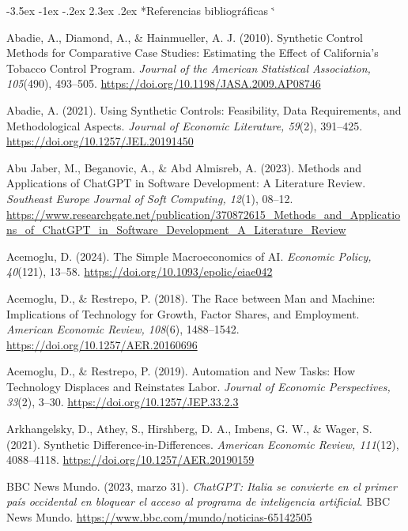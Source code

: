 \documentclass[12pt,a4paper]{article}
\makeatletter
\renewcommand{\refname}{\centering\normalfont Referencias bibliográficas}%
\renewcommand\section{\@startsection{section}{1}{\z@}%
  {-3.5ex \@plus -1ex \@minus -.2ex}%
  {2.3ex \@plus.2ex}%
  {\normalfont\normalsize}}
\renewenvironment{thebibliography}[1]{%
  \section*{\refname}%
  \list{}{%
    \usecounter{enumiv}%
    \setlength{\labelwidth}{0pt}%
    \setlength{\labelsep}{0pt}%
    \setlength{\leftmargin}{1.27cm}%
    \setlength{\itemindent}{-1.27cm}%
    \setlength{\itemsep}{\baselineskip}%
    \setlength{\parsep}{0pt}%
  }%
  \sloppy
  \clubpenalty4000\widowpenalty4000%
  \sfcode`\.\@m}%
  {\def\@noitemerr{\@latex@warning{Empty `thebibliography' environment}}%
   \endlist}
\makeatother
\begin{document}
{}
\begin{singlespacing}
\begin{thebibliography}{}
\setlength{\itemsep}{\baselineskip}  %

Abadie, A., Diamond, A., \& Hainmueller, A. J. (2010). Synthetic Control Methods for Comparative Case Studies: Estimating the Effect of California's Tobacco Control Program. \textit{Journal of the American Statistical Association, 105}(490), 493–505. \url{https://doi.org/10.1198/JASA.2009.AP08746}

Abadie, A. (2021). Using Synthetic Controls: Feasibility, Data Requirements, and Methodological Aspects. \textit{Journal of Economic Literature, 59}(2), 391–425. \url{https://doi.org/10.1257/JEL.20191450}

Abu Jaber, M., Beganovic, A., \& Abd Almisreb, A. (2023). Methods and Applications of ChatGPT in Software Development: A Literature Review. \textit{Southeast Europe Journal of Soft Computing, 12}(1), 08–12. \url{https://www.researchgate.net/publication/370872615_Methods_and_Applications_of_ChatGPT_in_Software_Development_A_Literature_Review}

Acemoglu, D. (2024). The Simple Macroeconomics of AI. \textit{Economic Policy, 40}(121), 13–58. \url{https://doi.org/10.1093/epolic/eiae042}

Acemoglu, D., \& Restrepo, P. (2018). The Race between Man and Machine: Implications of Technology for Growth, Factor Shares, and Employment. \textit{American Economic Review, 108}(6), 1488–1542. \url{https://doi.org/10.1257/AER.20160696}

Acemoglu, D., \& Restrepo, P. (2019). Automation and New Tasks: How Technology Displaces and Reinstates Labor. \textit{Journal of Economic Perspectives, 33}(2), 3–30. \url{https://doi.org/10.1257/JEP.33.2.3}

Arkhangelsky, D., Athey, S., Hirshberg, D. A., Imbens, G. W., \& Wager, S. (2021). Synthetic Difference-in-Differences. \textit{American Economic Review, 111}(12), 4088–4118. \url{https://doi.org/10.1257/AER.20190159}

BBC News Mundo. (2023, marzo 31). \textit{ChatGPT: Italia se convierte en el primer país occidental en bloquear el acceso al programa de inteligencia artificial}. BBC News Mundo. \url{https://www.bbc.com/mundo/noticias-65142505}


\end{thebibliography}
\end{singlespacing}
\end{document}
